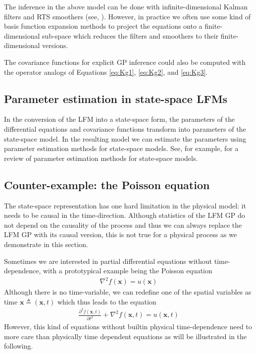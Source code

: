 \documentclass[journal]{IEEEtran}
\begin{document}
The inference in the above model can be done with infinite-dimensional Kalman filters and RTS smoothers (see, \cite{Sarkka+Hartikainen:2012}). However, in practice we often use some kind of basis function expansion methods to project the equations onto a finite-dimensional sub-space which reduces the filters and smoothers to their finite-dimensional versions.

The covariance functions for explicit GP inference could also be computed with the operator analogs of Equations \eqref{eq:Kg1}, \eqref{eq:Kg2}, and \eqref{eq:Kg3}.

\subsection{Parameter estimation in state-space LFMs}
%
In the conversion of the LFM into a state-space form, the parameters of the differential equations and covariance functions transform into parameters of the state-space model. In the resulting model we can estimate the parameters using parameter estimation methods for state-space models. See, for example, \cite{Sarkka:2013} for a review of parameter estimation methods for state-space models.

\subsection{Counter-example: the Poisson equation} \label{sec:poisson-problem}

The state-space representation has one hard limitation in the physical model: it needs to be causal in the time-direction. Although statistics of the LFM GP do not depend on the causality of the process and thus we can always replace the LFM GP with its causal version, this is not true for a physical process as we demonstrate in this section.

Sometimes we are interested in partial differential equations without time-dependence, with a prototypical example being the Poisson equation
%
\begin{equation}
\begin{split}
  \nabla^2 f(\mathbf{x}) = u(\mathbf{x})
\end{split}
\end{equation}
%
Although there is no time-variable, we can redefine one of the spatial variables as time $\mathbf{x} \triangleq (\mathbf{x},t)$ which thus leads to the equation
%
\begin{equation}
\begin{split}
  \frac{\partial^2 f(\mathbf{x},t)}{\partial t^2} + \nabla^2 f(\mathbf{x},t) = u(\mathbf{x},t)
\end{split}
\label{ipoisson}
\end{equation}
%
However, this kind of equations without builtin physical time-dependence need to more care than physically time dependent equations as will be illustrated in the following.
\end{document}
